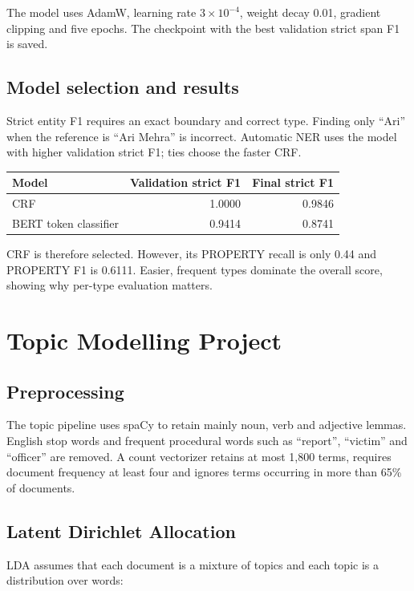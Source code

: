 \documentclass[12pt,a4paper]{report}
\begin{document}
The model uses AdamW, learning rate $3\times10^{-4}$, weight decay 0.01, gradient clipping and five epochs. The checkpoint with the best validation strict span F1 is saved.

\section{Model selection and results}

Strict entity F1 requires an exact boundary and correct type. Finding only ``Ari'' when the reference is ``Ari Mehra'' is incorrect. Automatic NER uses the model with higher validation strict F1; ties choose the faster CRF.

\begin{center}
\begin{tabular}{lrr}
\toprule
Model & Validation strict F1 & Final strict F1 \\
\midrule
CRF & 1.0000 & 0.9846 \\
BERT token classifier & 0.9414 & 0.8741 \\
\bottomrule
\end{tabular}
\end{center}

CRF is therefore selected. However, its PROPERTY recall is only 0.44 and PROPERTY F1 is 0.6111. Easier, frequent types dominate the overall score, showing why per-type evaluation matters.

\chapter{Topic Modelling Project}

\section{Preprocessing}

The topic pipeline uses spaCy to retain mainly noun, verb and adjective lemmas. English stop words and frequent procedural words such as ``report'', ``victim'' and ``officer'' are removed. A count vectorizer retains at most 1,800 terms, requires document frequency at least four and ignores terms occurring in more than 65\% of documents.

\section{Latent Dirichlet Allocation}

LDA assumes that each document is a mixture of topics and each topic is a distribution over words:
\end{document}
